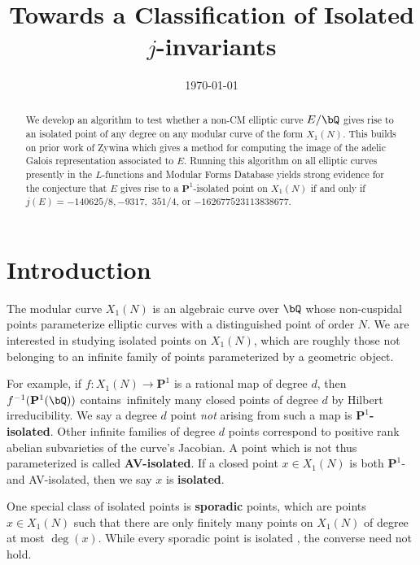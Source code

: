 \documentclass[11pt,reqno]{amsart}
\title{Towards a Classification of Isolated $j$-invariants}
\date{\today}
\theoremstyle{plain}
\theoremstyle{definition}
\newcommand{\Q}{\bQ}
\newcommand{\PP}{\mathbf P}
\newcommand{\iso}{\simeq}
\newcommand{\isom}{\cong}
\newcommand{\timo}[1]{\textcolor{red}{Timo: #1}}
\begin{document}
\begin{abstract}
We develop an algorithm to test whether a non-CM elliptic curve $E/\Q$ gives rise to an isolated point of any degree on any modular curve of the form $X_1(N)$. This builds on prior work of Zywina which gives a method for computing the image of the adelic Galois representation associated to $E$. Running this algorithm on all elliptic curves presently in the $L$-functions and Modular Forms Database yields strong evidence for the conjecture that $E$ gives rise to a $\PP^1$-isolated point on $X_1(N)$ if and only if $j(E)=-140625/8, -9317,$ $351/4$, or $-162677523113838677$.
\end{abstract}

\maketitle

\section{Introduction}
\label{sec:intro}



\label{sec:intro}

The modular curve $X_1(N)$ is an algebraic curve over $\Q$ whose non-cuspidal points parameterize elliptic curves with a distinguished point of order $N$. We are interested in studying isolated points on $X_1(N)$, which are roughly those not belonging to an infinite family of points parameterized by a geometric object. 

For example, if $f: X_1(N) \rightarrow \PP^1$ is a rational map of degree $d$, then $f^{-1}(\PP^1(\Q))$ contains~infinitely many closed points of degree $d$ by Hilbert irreducibility. %
We say a degree $d$ point \emph{not} arising from such a map is \textbf{$\PP^1$-isolated}. Other infinite families of degree $d$ points correspond to positive rank abelian subvarieties of the curve's Jacobian. %
A point which is not thus parameterized is called \textbf{AV-isolated}. If a closed point $x\in X_1(N)$ is both $\PP^1$- and AV-isolated, then we say $x$ is \textbf{isolated}. 

One special class of isolated points is \textbf{sporadic} points, which are points $x \in X_1(N)$ such that there are only finitely many points on $X_1(N)$ of degree at most $\deg(x)$. While every sporadic point is isolated \cite[Theorem 4.2]{BELOV}, the converse need not hold.
\end{document}
